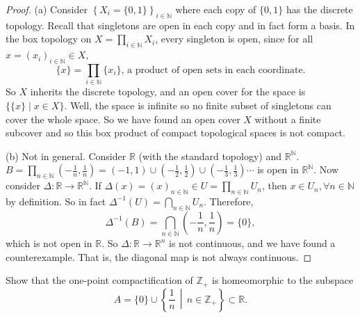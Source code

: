 \documentclass[addpoints,10pt]{exam}
\theoremstyle{plain}
\theoremstyle{definition}
\newtheorem{prob}[thm]{Problem}
\theoremstyle{plain}
\theoremstyle{definition}
\let\oldprob\prob
\let\endoldprob\endprob
\renewenvironment{prob}
  {\begin{singlespace}\oldprob}
  {\endoldprob\end{singlespace}}
\newcommand{\NN}{\ensuremath{\mathbb{N}}}
\newcommand{\RR}{\ensuremath{\mathbb{R}}}
\newcommand{\ZZ}{\ensuremath{\mathbb{Z}}}
\begin{document}
\begin{proof}
    (a) Consider $\left\{X_{i}=\{0,1\}\right\}_{i\in \NN}$ where each copy of $\{0,1\}$ has the discrete topology. Recall that singletons are open in each copy and in fact form a basis. In the box topology on
    $X=\prod_{i\in\NN}X_i$, every singleton is open, since for all $x=(x_{i})_{i\in \NN}\in X,$
    \[
    \{x\}=\prod_{i\in\NN}\{x_i\} \text{, a product of open sets in each coordinate.}
    \]
    So $X$ inherits the discrete topology, and an open cover for the space is $\{\{x\}\mid x\in X\}$. Well, the space is infinite so no finite subset of singletons can cover the whole space. So we have found an open cover $X$ without a finite subcover and so this box product of compact topological spaces is not
    compact.

    (b) Not in general. Consider $\RR$ (with the standard topology) and $\RR^{\NN}$.
    $B=\prod_{n\in \NN}\left(-\frac1n,\frac1n\right)=(-1,1)\cup (-\frac{1}{2},\frac{1}{2})\cup (-\frac{1}{3},\frac{1}{3}) \cdots$ is open in $\RR^{\NN}$. Now consider $\Delta:\RR\to \RR^{\NN}.$ If $\Delta(x)=(x)_{n\in \NN}\in U=\prod_{n\in \NN} U_{n}$, then $x\in U_{n},\forall n\in \NN$ by definition. So in fact $\Delta^{-1}(U)=\bigcap_{n\in \NN}U_{n}$. Therefore,
    \[
    \Delta^{-1}(B)=\bigcap_{n\in \NN}
    \left(-\frac1n,\frac1n\right)=\{0\},
    \]
    which is not open in $\RR$. So $\Delta:\RR\to \RR^{n}$ is not continuous, and we have found a counterexample. That is, the diagonal map is not always continuous.

\end{proof}
\newpage
\begin{prob}
Show that the one-point compactification of $\ZZ_{+}$ is homeomorphic to the
subspace
\[
A=\{0\}\cup\left\{\frac1n\,\middle|\,n\in\ZZ_{+}\right\}
\subset\RR.
\]
\end{prob}
\end{document}
